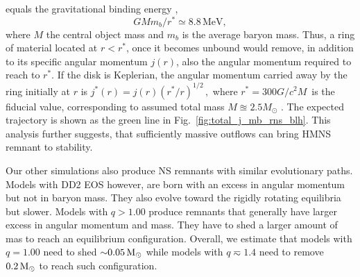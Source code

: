 equals the gravitational binding energy
\citep[\eg][]{Fernandez:2013tya}, 
%
\begin{equation*}
    G M m_b / r^* \simeq 8.8\, \text{MeV}, 
\end{equation*}
%
where $M$ the central object mass and $m_b$ is the average baryon mass.
Thus, a ring of material located at $r < r^*$, once it becomes unbound
would remove, in addition to its specific angular
momentum $j(r)$, also the angular momentum required to reach
to $r^*$. If the disk is Keplerian, the angular momentum carried away by 
the ring initially at $r$ is 
%
    $ j^*(r) = j(r) ( r^* / r )^{1/2}\, ,$
%
where $ r^{*} = 300 G / c^2 M \,$ is the fiducial value, corresponding
to assumed total mass $M \approxeq 2.5M_{\odot}$ \citep{Radice:2018xqa}.
The expected trajectory is shown as the green line in Fig.~\ref{fig:total_j_mb_rns_blh}.
%
This analysis further suggests, that sufficiently massive outflows 
can bring \pmerg{} \ac{HMNS} remnant to stability. 

%
%
Our other simulations also produce \ac{NS} remnants with similar evolutionary paths. 
Models with DD2 \ac{EOS} however, are born with an excess in angular momentum but not in 
baryon mass. They also evolve toward the rigidly rotating equilibria but slower.
Models with $q>1.00$ produce remnants that generally have larger excess in angular momentum 
and mass. They have to shed a larger amount of mas to reach an equilibrium configuration.
Overall, we estimate that models with $q=1.00$ need to shed ${\sim}0.05\,{\text{M}_{\odot}}$ while 
models with $q\eqsim 1.4$ need to remove $0.2\,{\text{M}_{\odot}}$ to reach such configuration.
















